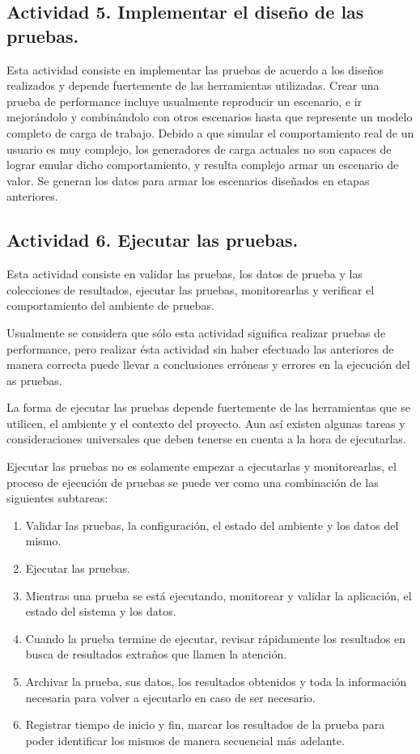 \subsection{Actividad 5. Implementar el diseño de las pruebas.}
Esta actividad consiste en implementar las pruebas de acuerdo a los diseños realizados y depende fuertemente de las herramientas utilizadas. 
Crear una prueba de performance incluye usualmente reproducir un escenario, e ir mejorándolo y combinándolo con otros escenarios hasta que represente un modelo completo de carga de trabajo.
Debido a que simular el comportamiento real de un usuario es muy complejo, los generadores de carga actuales no son capaces de lograr emular dicho comportamiento, y resulta complejo armar un escenario de valor. Se generan los datos para armar los escenarios diseñados en etapas anteriores.

\subsection{Actividad 6. Ejecutar las pruebas.}
 Esta actividad consiste en validar las pruebas, los datos de prueba y las colecciones de resultados, ejecutar las pruebas, monitorearlas y verificar el comportamiento del ambiente de pruebas.
 
Usualmente se considera que sólo esta actividad significa realizar pruebas de performance, pero realizar ésta actividad sin haber efectuado las anteriores de manera
correcta puede llevar a conclusiones erróneas y errores en la ejecución del as pruebas.

La forma de ejecutar las pruebas depende fuertemente de las herramientas que se utilicen, el ambiente y el contexto del proyecto. Aun así existen algunas tareas y consideraciones
universales que deben tenerse en cuenta a la hora de ejecutarlas.

Ejecutar las pruebas no es solamente empezar a ejecutarlas y monitorearlas, el proceso de ejecución de pruebas se puede ver como una combinación de las siguientes subtareas:
\begin{enumerate}
	\item
	Validar las pruebas, la configuración, el estado del ambiente y los datos del mismo.
	\item
	Ejecutar las pruebas.
	\item
	Mientras una prueba se está ejecutando, monitorear y validar la aplicación, el estado del sistema y los datos.
	\item
	Cuando la prueba termine de ejecutar, revisar rápidamente los resultados en busca de resultados extraños que llamen la atención.
	\item
	Archivar la prueba, sus datos, los resultados obtenidos y toda la información necesaria para volver a ejecutarlo en caso de ser necesario.
	\item
	Registrar tiempo de inicio y fin, marcar los resultados de la prueba para poder identificar los mismos de manera secuencial más adelante.
\end{enumerate}

